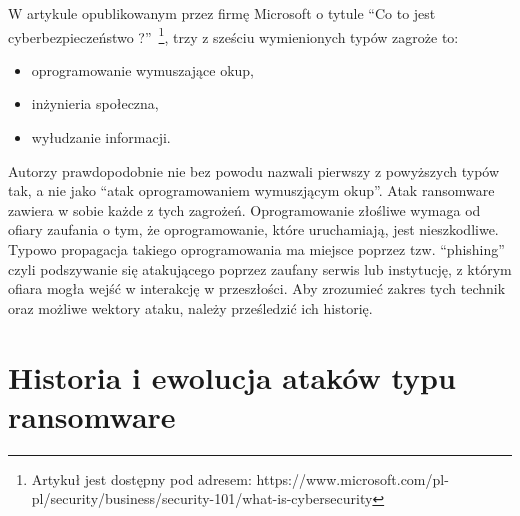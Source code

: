 W artykule opublikowanym przez firmę Microsoft o tytule \enquote{Co to jest cyberbezpieczeństwo ?}~\footnote{Artykuł jest dostępny pod adresem: https://www.microsoft.com/pl-pl/security/business/security-101/what-is-cybersecurity}, trzy z sześciu wymienionych typów zagroże to: 
\begin{itemize}
    \item oprogramowanie wymuszające okup,
    \item inżynieria społeczna,
    \item wyłudzanie informacji.
\end{itemize}
Autorzy prawdopodobnie nie bez powodu nazwali pierwszy z powyższych typów tak, a nie jako \enquote{atak oprogramowaniem wymuszjącym okup}. Atak ransomware zawiera w sobie każde z tych zagrożeń. Oprogramowanie złośliwe wymaga od ofiary zaufania o tym, że oprogramowanie, które uruchamiają, jest nieszkodliwe. Typowo propagacja takiego oprogramowania ma miejsce poprzez tzw. \foreignquote{english}{phishing} czyli podszywanie się atakującego poprzez zaufany serwis lub instytucję, z którym ofiara mogła wejść w interakcję w przeszłości. Aby zrozumieć zakres tych technik oraz możliwe wektory ataku, należy prześledzić ich historię.
\section{Historia i ewolucja ataków typu ransomware}

